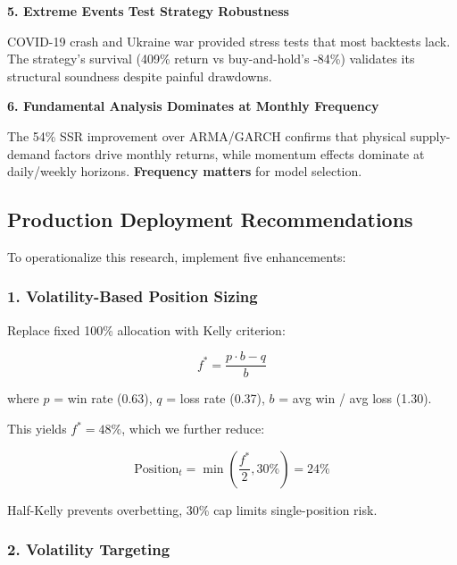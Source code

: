 \documentclass[12pt,a4paper]{article}
\begin{document}
{{        \vspace{0.2cm}
        \textbf{5. Extreme Events Test Strategy Robustness}

        COVID-19 crash and Ukraine war provided stress tests that most backtests lack. The strategy's survival (409\% return vs buy-and-hold's -84\%) validates its structural soundness despite painful drawdowns.

        \vspace{0.2cm}
        \textbf{6. Fundamental Analysis Dominates at Monthly Frequency}

        The 54\% SSR improvement over ARMA/GARCH confirms that physical supply-demand factors drive monthly returns, while momentum effects dominate at daily/weekly horizons. \textbf{Frequency matters} for model selection.
    }%
}

\vspace{0.5cm}

\subsection{Production Deployment Recommendations}

To operationalize this research, implement five enhancements:

\subsubsection{1. Volatility-Based Position Sizing}

Replace fixed 100\% allocation with Kelly criterion:

\begin{equation}
f^* = \frac{p \cdot b - q}{b}
\end{equation}

where $p$ = win rate (0.63), $q$ = loss rate (0.37), $b$ = avg win / avg loss (1.30).

This yields $f^* = 48\%$, which we further reduce:

\begin{equation}
\text{Position}_t = \min\left(\frac{f^*}{2}, 30\%\right) = 24\%
\end{equation}

Half-Kelly prevents overbetting, 30\% cap limits single-position risk.

\subsubsection{2. Volatility Targeting}
\end{document}
